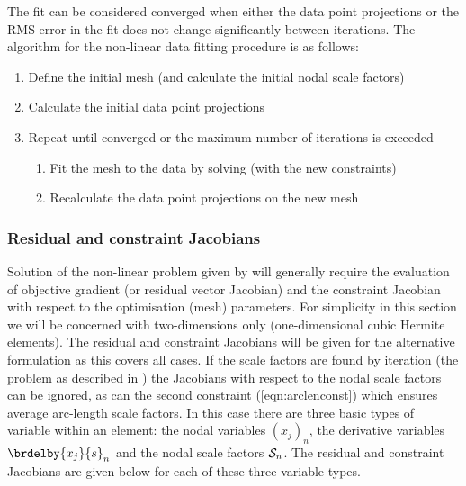 The fit can be considered converged when either the data point projections or
the RMS error in the fit does not change significantly between iterations.
The algorithm for the non-linear data fitting procedure is as follows:

\begin{enumerate}
  \item Define the initial mesh (and calculate the initial nodal scale factors)
  \item Calculate the initial data point projections
  \item Repeat until converged or the maximum number of iterations is exceeded
  \begin{enumerate}
    \item Fit the mesh to the data by solving  (with
      the new constraints)
    \item Recalculate the data point projections on the new mesh
  \end{enumerate}
\end{enumerate}

\subsubsection{Residual and constraint Jacobians}
\label{sec:resandcontjacs}

Solution of the non-linear problem given by  will
generally require the evaluation of objective gradient (or residual vector
Jacobian) and the constraint Jacobian with respect to the optimisation (mesh)
parameters. For simplicity in this section we will be concerned with
two-dimensions only (\ie  one-dimensional cubic Hermite elements). The
residual and constraint Jacobians will be given for the alternative
formulation as this covers all cases. If the scale factors are found by
iteration (\ie the problem as described in ) the
Jacobians with respect to the nodal scale factors can be ignored, as can the
second constraint (\eqref{eqn:arclenconst}) which ensures average arc-length
scale factors.  In this case there are three basic types of variable within an
element: the nodal variables $\left(x_{j} \right)_{n}$, the derivative
variables $\brdelby{x_{j}}{s}_{n}$ and the nodal scale factors ${\cal S}_{n}$.
The residual and constraint Jacobians are given below for each of these three
variable types.

